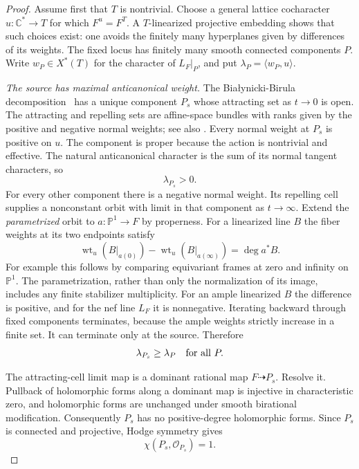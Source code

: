 \begin{proof}
Assume first that $T$ is nontrivial.  Choose a general lattice
cocharacter $u:\mathbb C^*\to T$ for which $F^u=F^T$.  A
$T$-linearized projective embedding shows that such choices exist:
one avoids the finitely many hyperplanes given by differences of its
weights.  The fixed locus has finitely many smooth connected
components $P$.  Write $w_P\in X^*(T)$ for the character of
$L_F|_P$, and put $\lambda_P=\langle w_P,u\rangle$.

\emph{The source has maximal anticanonical weight.}
The Bia\l ynicki-Birula decomposition~\cite{BB1973} has a unique
component $P_s$ whose attracting set as $t\to0$ is open.  The
attracting and repelling sets are affine-space bundles with ranks
given by the positive and negative normal weights; see also
\cite[Theorem~1.5 and Corollary~7.3]{JelisiejewSienkiewicz2019}.
Every normal weight at $P_s$ is positive on $u$.  The component is
proper because the action is nontrivial and effective.  The natural
anticanonical character is the sum of its normal tangent characters,
so
\begin{equation}\label{ext:source-positive}
 \lambda_{P_s}>0.
\end{equation}
For every other component there is a negative normal weight.  Its
repelling cell supplies a nonconstant orbit with limit in that
component as $t\to\infty$.  Extend the \emph{parametrized} orbit to
$a:\mathbb P^1\to F$ by properness.  For a linearized line $B$ the
fiber weights at its two endpoints satisfy
\begin{equation}\label{ext:orbit-degree}
 \operatorname{wt}_u(B|_{a(0)})-
 \operatorname{wt}_u(B|_{a(\infty)})
       =\deg a^*B.
\end{equation}
For example this follows by comparing equivariant frames at zero
and infinity on $\mathbb P^1$.  The parametrization, rather than
only the normalization of its image, includes any finite stabilizer
multiplicity.  For an ample linearized $B$ the difference is
positive, and for the nef line $L_F$ it is nonnegative.  Iterating
backward through fixed components terminates, because the ample
weights strictly increase in a finite set.  It can terminate only
at the source.  Therefore
\begin{equation}\label{ext:source-maximum}
 \lambda_{P_s}\geq\lambda_P\quad\hbox{for all }P.
\end{equation}

The attracting-cell limit map is a dominant rational map
$F\dashrightarrow P_s$.  Resolve it.  Pullback of holomorphic
forms along a dominant map is injective in characteristic zero,
and holomorphic forms are unchanged under smooth birational
modification.  Consequently $P_s$ has no positive-degree
holomorphic forms.  Since $P_s$ is connected and projective,
Hodge symmetry gives
\begin{equation}\label{ext:source-euler}
 \chi(P_s,\mathcal O_{P_s})=1.
\end{equation}


\end{proof}
